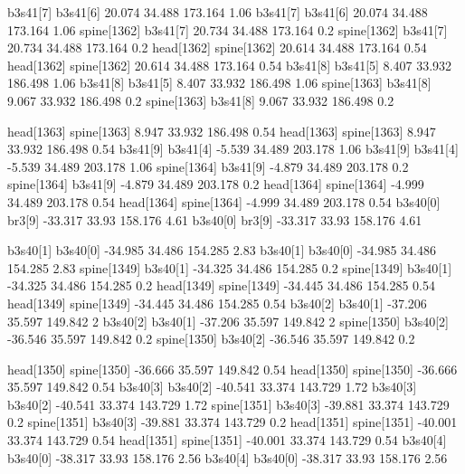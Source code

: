 b3s41[7]    b3s41[6]    20.074    34.488    173.164    1.06
b3s41[7]    b3s41[6]    20.074    34.488    173.164    1.06
spine[1362]    b3s41[7]    20.734    34.488    173.164    0.2
spine[1362]    b3s41[7]    20.734    34.488    173.164    0.2
head[1362]    spine[1362]    20.614    34.488    173.164    0.54
head[1362]    spine[1362]    20.614    34.488    173.164    0.54
b3s41[8]    b3s41[5]    8.407    33.932    186.498    1.06
b3s41[8]    b3s41[5]    8.407    33.932    186.498    1.06
spine[1363]    b3s41[8]    9.067    33.932    186.498    0.2
spine[1363]    b3s41[8]    9.067    33.932    186.498    0.2


head[1363]    spine[1363]    8.947    33.932    186.498    0.54
head[1363]    spine[1363]    8.947    33.932    186.498    0.54
b3s41[9]    b3s41[4]    -5.539    34.489    203.178    1.06
b3s41[9]    b3s41[4]    -5.539    34.489    203.178    1.06
spine[1364]    b3s41[9]    -4.879    34.489    203.178    0.2
spine[1364]    b3s41[9]    -4.879    34.489    203.178    0.2
head[1364]    spine[1364]    -4.999    34.489    203.178    0.54
head[1364]    spine[1364]    -4.999    34.489    203.178    0.54
b3s40[0]    br3[9]    -33.317    33.93    158.176    4.61
b3s40[0]    br3[9]    -33.317    33.93    158.176    4.61


b3s40[1]    b3s40[0]    -34.985    34.486    154.285    2.83
b3s40[1]    b3s40[0]    -34.985    34.486    154.285    2.83
spine[1349]    b3s40[1]    -34.325    34.486    154.285    0.2
spine[1349]    b3s40[1]    -34.325    34.486    154.285    0.2
head[1349]    spine[1349]    -34.445    34.486    154.285    0.54
head[1349]    spine[1349]    -34.445    34.486    154.285    0.54
b3s40[2]    b3s40[1]    -37.206    35.597    149.842    2
b3s40[2]    b3s40[1]    -37.206    35.597    149.842    2
spine[1350]    b3s40[2]    -36.546    35.597    149.842    0.2
spine[1350]    b3s40[2]    -36.546    35.597    149.842    0.2


head[1350]    spine[1350]    -36.666    35.597    149.842    0.54
head[1350]    spine[1350]    -36.666    35.597    149.842    0.54
b3s40[3]    b3s40[2]    -40.541    33.374    143.729    1.72
b3s40[3]    b3s40[2]    -40.541    33.374    143.729    1.72
spine[1351]    b3s40[3]    -39.881    33.374    143.729    0.2
spine[1351]    b3s40[3]    -39.881    33.374    143.729    0.2
head[1351]    spine[1351]    -40.001    33.374    143.729    0.54
head[1351]    spine[1351]    -40.001    33.374    143.729    0.54
b3s40[4]    b3s40[0]    -38.317    33.93    158.176    2.56
b3s40[4]    b3s40[0]    -38.317    33.93    158.176    2.56


